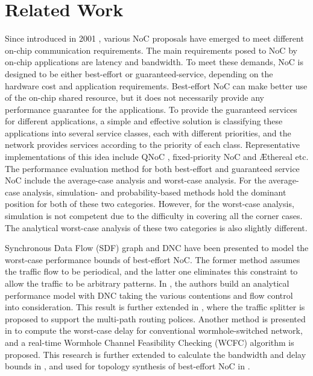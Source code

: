 \documentclass[10pt,journal]{IEEEtran}
\begin{document}
\section{Related Work}\label{related}
Since introduced in 2001 \cite{DaTo01}, various NoC proposals have emerged to meet different on-chip communication requirements. The main requirements posed to NoC by on-chip applications are latency and bandwidth. To meet these demands, NoC is designed to be either best-effort or guaranteed-service, depending on the hardware cost and application requirements. Best-effort NoC can make better use of the on-chip shared resource, but it does not necessarily provide any performance guarantee for the applications. To provide the guaranteed services for different applications, a simple and effective solution is classifying these applications into several service classes, each with different priorities, and the network provides services according to the priority of each class. Representative implementations of this idea include QNoC \cite{BCGK04}, fixed-priority NoC \cite{Shi:2008:RCA:1397757.1397996} and {{\AE}thereal} \cite{GoDR05} etc. The performance evaluation method for both best-effort and guaranteed service NoC include the average-case analysis and worst-case analysis. For the average-case analysis, simulation- and probability-based methods hold the dominant position for both of these two categories. However, for the worst-case analysis, simulation is not competent due to the difficulty in covering all the corner cases. The analytical worst-case analysis of these two categories is also slightly different.

Synchronous Data Flow (SDF) graph \cite{poplavko2003task} and DNC \cite{qian2009analysis} have been presented to model the worst-case performance bounds of best-effort NoC. The former method assumes the traffic flow to be periodical, and the latter one eliminates this constraint to allow the traffic to be arbitrary patterns. In \cite{qian2009analysis}, the authors build an analytical performance model with DNC taking the various contentions and flow control into consideration. This result is further extended in \cite{Du:2012:WPA:2380445.2380469}, where the traffic splitter is proposed to support the multi-path routing polices. Another method is presented in \cite{Lee:2003:RWC:846077.846083} to compute the worst-case delay for conventional wormhole-switched network, and a real-time Wormhole Channel Feasibility Checking (WCFC) algorithm is proposed. This research is further extended to calculate the bandwidth and delay bounds in \cite{6109240}, and used for topology synthesis of best-effort NoC in \cite{EPFL-ARTICLE-186879}.
\end{document}
